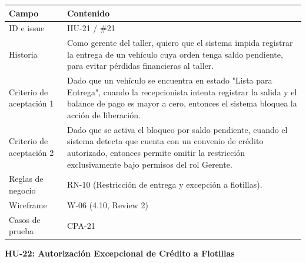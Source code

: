 {\def\LTcaptype{none} %
\begin{longtable}[]{@{}
  >{\raggedright\arraybackslash}p{}
  >{\raggedright\arraybackslash}p{}@{}}
\toprule\noalign{}
\begin{minipage}[b]{\linewidth}\raggedright
\textbf{Campo}
\end{minipage} & \begin{minipage}[b]{\linewidth}\raggedright
\textbf{Contenido}
\end{minipage} \\
\midrule\noalign{}
\endhead
\bottomrule\noalign{}
\endlastfoot
ID e issue & HU-21 / \#21 \\
Historia & Como gerente del taller, quiero que el sistema impida
registrar la entrega de un vehículo cuya orden tenga saldo pendiente,
para evitar pérdidas financieras al taller. \\
Criterio de aceptación 1 & Dado que un vehículo se encuentra en estado
"Lista para Entrega", cuando la recepcionista intenta registrar la
salida y el balance de pago es mayor a cero, entonces el sistema bloquea
la acción de liberación. \\
Criterio de aceptación 2 & Dado que se activa el bloqueo por saldo
pendiente, cuando el sistema detecta que cuenta con un convenio de
crédito autorizado, entonces permite omitir la restricción
exclusivamente bajo permisos del rol Gerente. \\
Reglas de negocio & RN-10 (Restricción de entrega y excepción a
flotillas). \\
Wireframe & W-06 (4.10, Review 2) \\
Casos de prueba & CPA-21 \\
\end{longtable}
}

\textbf{HU-22: Autorización Excepcional de Crédito a Flotillas}

